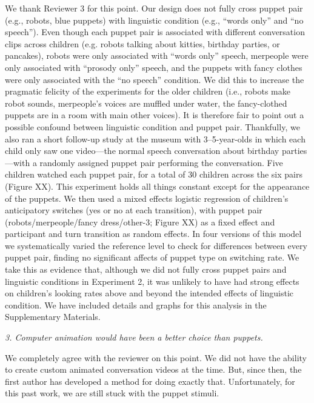 \documentclass[11pt,a4paper]{letter} %
\begin{document}
\begin{letter}{}
\noindent We thank Reviewer 3 for this point. Our design does not fully cross puppet pair (e.g., robots, blue puppets) with linguistic condition (e.g., ``words only'' and ``no speech''). Even though each puppet pair is associated with different conversation clips across children (e.g. robots talking about kitties, birthday parties, or pancakes), robots were only associated with ``words only'' speech, merpeople were only associated with ``prosody only'' speech, and the puppets with fancy clothes were only associated with the ``no speech'' condition. We did this to increase the pragmatic felicity of the experiments for the older children (i.e., robots make robot sounds, merpeople's voices are muffled under water, the fancy-clothed puppets are in a room with main other voices). It is therefore fair to point out a possible confound between linguistic condition and puppet pair. Thankfully, we also ran a short follow-up study at the museum with 3--5-year-olds in which each child only saw one video---the normal speech conversation about birthday parties---with a randomly assigned puppet pair performing the conversation. Five children watched each puppet pair, for a total of 30 children across the six pairs (Figure XX). This experiment holds all things constant except for the appearance of the puppets. We then used a mixed effects logistic regression of children's anticipatory switches (yes or no at each transition), with puppet pair (robots/merpeople/fancy dress/other-3; Figure XX) as a fixed effect and participant and turn transition as random effects. In four versions of this model we systematically varied the reference level to check for differences between every puppet pair, finding no significant affects of puppet type on switching rate. We take this as evidence that, although we did not fully cross puppet pairs and linguistic conditions in Experiment 2, it was unlikely to have had strong effects on children's looking rates above and beyond the intended effects of linguistic condition. We have included details and graphs for this analysis in the Supplementary Materials. 

\smallskip

\noindent \textit{3. Computer animation would have been a better choice than puppets.}

\noindent We completely agree with the reviewer on this point. We did not have the ability to create custom animated conversation videos at the time. But, since then, the first author has developed a method for doing exactly that. Unfortunately, for this past work, we are still stuck with the puppet stimuli.


\end{letter}
\end{document}
